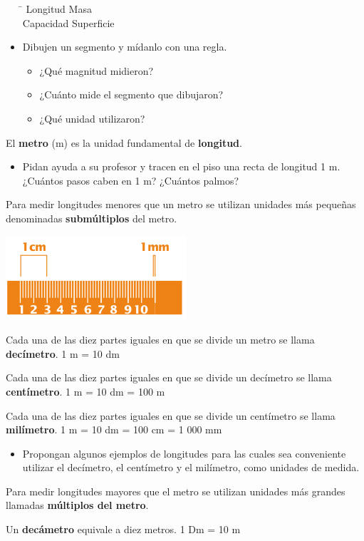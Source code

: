 \documentclass[letterpaper,11pt,twoside]{article}
\begin{document}
\begin{multicols}{2}
\begin{itemize}
\begin{tabbing}
\hspace{3cm}\=\kill
Longitud \> Masa \\ 
Capacidad \> Superficie 
\end{tabbing}
\item Dibujen un segmento y mídanlo con una regla.
\begin{itemize}
\item ¿Qué magnitud midieron?
\item ¿Cuánto mide el segmento que dibujaron?
\item ¿Qué unidad utilizaron?
\end{itemize}
\end{itemize}
El \textbf{metro} (m) es la unidad fundamental de \textbf{longitud}.
\begin{itemize}
\item Pidan ayuda a su profesor y tracen en el piso una recta de longitud 1 m. ¿Cuántos pasos caben en 1 m? ¿Cuántos palmos?
\end{itemize}
Para medir longitudes menores que un metro se utilizan unidades más pequeñas denominadas \textbf{submúltiplos} del metro.
\begin{center}
\includegraphics[scale=.55]{Images/regla.png} 
\end{center}
Cada una de las diez partes iguales en que se divide un metro se llama \textbf{decímetro}. 1 m = 10 dm

Cada una de las diez partes iguales en que se divide un decímetro se llama \textbf{centímetro}. 1 m = 10 dm = 100 m

Cada una de las diez partes iguales en que se divide un centímetro se llama \textbf{milímetro}. 1 m = 10 dm = 100 cm = 1 000 mm
\begin{itemize}
\item Propongan algunos ejemplos de longitudes para las cuales sea conveniente utilizar el decímetro, el centímetro y el milímetro, como unidades de medida.
\end{itemize}
Para medir longitudes mayores que el metro se utilizan unidades más grandes llamadas \textbf{múltiplos del metro}.

Un \textbf{decámetro} equivale a diez metros. 1 Dm = 10 m


\end{multicols}
\end{document}
